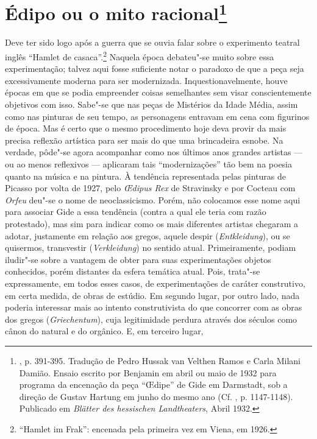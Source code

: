 \chapter{Édipo ou o mito racional\footnote[*]{, p. 391-395. Tradução de
  Pedro Hussak van Velthen Ramos e Carla Milani Damião. Ensaio escrito
  por Benjamin em abril ou maio de 1932 para programa da encenação da
  peça ``\OE dipe'' de Gide em Darmstadt, sob a direção de Gustav Hartung
  em junho do mesmo ano (Cf. , p. 1147-1148). Publicado em
  \emph{Blätter des hessischen Landtheaters}, Abril 1932.}}

Deve ter sido logo após a guerra que se ouvia falar sobre o experimento
teatral inglês ``Hamlet de casaca''.\footnote{``Hamlet im Frak'':
  encenada pela primeira vez em Viena, em 1926. \versal{[N. E.]}} Naquela época
debateu"-se muito sobre essa experimentação; talvez aqui fosse suficiente
notar o paradoxo de que a peça seja excessivamente moderna para ser
modernizada. Inquestionavelmente, houve épocas em que se podia
empreender coisas semelhantes sem visar conscientemente objetivos com
isso. Sabe"-se que nas peças de Mistérios da Idade Média, assim como nas
pinturas de seu tempo, as personagens entravam em cena com figurinos de
época. Mas é certo que o mesmo procedimento hoje deva provir da mais
precisa reflexão artística para ser mais do que uma brincadeira esnobe.
Na verdade, pôde"-se agora acompanhar como nos últimos anos grandes
artistas --- ou ao menos reflexivos --- aplicaram tais ``modernizações''
tão bem na poesia quanto na música e na pintura. À tendência
representada pelas pinturas de Picasso por volta de 1927, pelo
\emph{\OE dipus Rex} de Stravinsky e por Cocteau com \emph{Orfeu} deu"-se o
nome de neoclassicismo. Porém, não colocamos esse nome aqui para
associar Gide a essa tendência (contra a qual ele teria com razão
protestado), mas sim para indicar como os mais diferentes artistas
chegaram a adotar, justamente em relação aos gregos, aquele despir
(\emph{Entkleidung}), ou se quisermos, transvestir (\emph{Verkleidung})
no sentido atual. Primeiramente, podiam iludir"-se sobre a vantagem de
obter para suas experimentações objetos conhecidos, porém distantes da
esfera temática atual. Pois, trata"-se expressamente, em todos esses
casos, de experimentações de caráter construtivo, em certa medida, de
obras de estúdio. Em segundo lugar, por outro lado, nada poderia
interessar mais ao intento construtivista do que concorrer com as obras
dos gregos (\emph{Griechentum}), cuja legitimidade perdura através dos
séculos como cânon do natural e do orgânico. E, em terceiro lugar,
